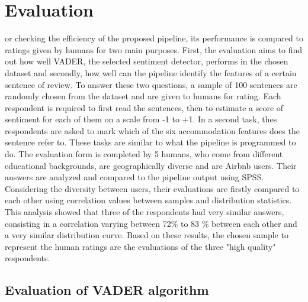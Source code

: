 %
%


\let\textcircled=\pgftextcircled
\chapter{Evaluation}
\label{chap:eva}

or checking the efficiency of the proposed pipeline, its performance is compared to ratings given by humans for two main purposes. First, the evaluation aims to find out how well VADER, the selected sentiment detector, performs in the chosen dataset and secondly, how well can the pipeline identify the features of a certain sentence of review. To answer these two questions, a sample of 100 sentences are randomly chosen from the dataset and are given to humans for rating. Each respondent is required to first read the sentences, then to estimate a score of sentiment for each of them on a scale from -1 to +1. In a second task, thes respondents are asked to mark which of the six accommodation features does the sentence refer to. These tasks are similar to what the pipeline is programmed to do. 
The evaluation form is completed by 5 humans, who come from different educational backgrounds, are geographically diverse and are Airbnb users. Their answers are analyzed and compared to the pipeline output using SPSS. Considering the diversity between users, their evaluations are firstly compared to each other using correlation values between samples and distribution statistics. This analysis showed that three of the respondents had very similar answers, consisting in a correlation varying between 72\% to 83 \% between each other and a very similar distribution curve. 
Based on these results, the chosen sample to represent the human ratings are the evaluations of the three "high quality" respondents.

\section{Evaluation of VADER algorithm}

